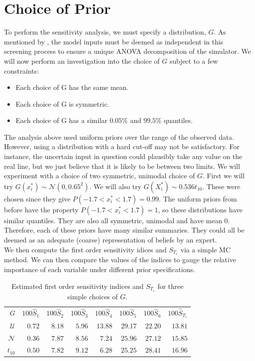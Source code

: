 \documentclass[12pt]{article}
\begin{document}
\section{Choice of Prior}

To perform the sensitivity analysis, we must specify a distribution, $G$. As mentioned by \cite{Merrel2012}, the model inputs must be deemed as independent in this screening process to ensure a unique ANOVA decomposition of the simulator. We will now perform an investigation into the choice of $G$ subject to a few constraints:\\

\begin{itemize}
	\item Each choice of G has the same mean.
	\item Each choice of G is symmetric.
	\item Each choice of G has a similar $0.05\%$ and $99.5\%$ quantiles.
\end{itemize}

The analysis above used uniform priors over the range of the observed data. However, using a distribution with a hard cut-off may not be satisfactory. For instance, the uncertain input in question could plausibly take any value on the real line, but we just believe that it is likely to be between two limits. We will experiment with a choice of two symmetric, unimodal choice of $G$. First we will try $G(x^*_i) \sim \mathcal{N}(0,0.65^2)$. We will also try $G(X^*_i) \sim 0.536t_{10} $. These were chosen since they give $P(-1.7 < x^*_i < 1.7) = 0.99$. The uniform priors from before have the property $P(-1.7 < x^*_i <1.7) = 1$, so these distributions have similar quantiles. They are also all symmetric, unimodal and have mean $0$. Therefore, each of these priors have many similar summaries. They could all be deemed as an adequate (coarse) representation of beliefs by an expert.\\

We then compute the first order sensitivity idices and $S_{T_\varepsilon}$ via a simple MC method. We can then compare the values of the indices to gauge the relative importance of each variable under different prior specifications.

\begin{table}[ht]
\centering
\begin{tabular}{rrrrrrrr}
  \toprule
 $G$ & $100\hat{S}_1$ & $100\hat{S}_2$ & $100\hat{S}_3$ & $100\hat{S}_4$ & $100\hat{S}_5$ & $100\hat{S}_6$ & $100\hat{S}_{T_\varepsilon}$\\ 
  \cmidrule{1-8}
$\mathcal{U}$ & $0.72$ & $8.18$ & $5.96$ & $13.88$ & $29.17$ & $22.20$ & $13.81$\\ 
  $\mathcal{N}$ & $0.36$ & $7.87$ & $8.56$ & $7.24$ & $25.96$ & $27.12$ & $15.85$\\ 
  $t_{10}$ & $0.50$ & $7.82$ & $9.12$ & $6.28$ & $25.25$ & $28.41$ & $16.96$\\ 
   \bottomrule
\end{tabular}
\caption{Estimated first order sensitivity indices and $S_{T_\varepsilon}$ for three simple choices of $G$.}
\label{Tab:sa-sensitivity}
\end{table}
\end{document}
